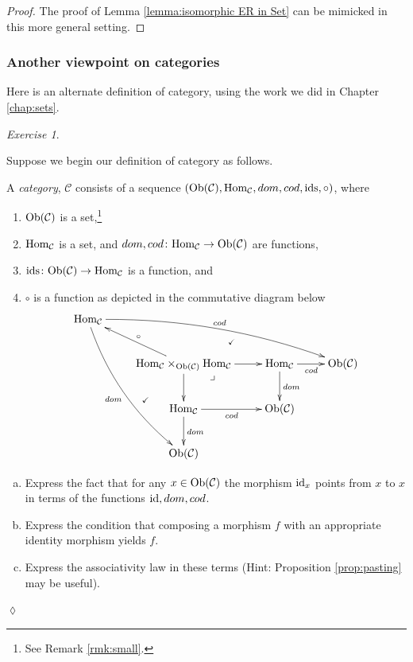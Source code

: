 \documentclass{book}
\makeatletter
\def\tn{\textnormal}
\def\mc{\mathcal}
\def\Hom{\tn{Hom}}
\def\Ob{\tn{Ob}}
\def\to{\rightarrow}
\def\taking{\colon}
\def\ullimit{\ar@{}[rd]|(.3)*+{\lrcorner}}
\def\id{\tn{id}}
\def\ids{\tn{ids}}
\def\mcC{\mc{C}}
\theoremstyle{remark}
\newtheorem{exc}[subsubsection]{Exercise}
\newenvironment{exercise}{\begin{exc}}{\hspace*{\fill}$\lozenge$\end{exc}}
\theoremstyle{definition}
\def\sexc{\begin{enumerate}[a.)]\setlength{\itemsep}{.1cm}\setlength{\parskip}{.1cm}\item}
\def\next{\item}
\def\endsexc{\end{enumerate}}
\makeatother
\begin{document}
\begin{proof}

The proof of Lemma \ref{lemma:isomorphic ER in Set} can be mimicked in this more general setting.

\end{proof}


\subsubsection{Another viewpoint on categories}

Here is an alternate definition of category, using the work we did in Chapter \ref{chap:sets}.

\begin{exercise}\label{exc:cat in set}

Suppose we begin our definition of category as follows. 

A {\em category}, $\mcC$ consists of a sequence $(\Ob(\mcC),\Hom_\mcC,dom,cod,\ids,\circ)$, where 
\begin{enumerate}
\item $\Ob(\mcC)$ is a set,\footnote{See Remark \ref{rmk:small}.}
\item $\Hom_\mcC$ is a set, and $dom,cod\taking\Hom_\mcC\to\Ob(\mcC)$ are functions, 
\item $\ids\taking\Ob(\mcC)\to\Hom_\mcC$ is a function, and 
\item $\circ$ is a function as depicted in the commutative diagram below
\begin{align}\label{dia:pullback version of cat}
\xymatrix{
\Hom_\mcC\ar@/^1pc/[drrr]^{cod}\ar@/_1pc/[dddr]_{dom}&&\\
&\Hom_\mcC\times_{\Ob(\mcC)}\Hom_\mcC\ar@{}[ur]|{\checkmark}\ar@{}[ddl]|(.4){\checkmark}\ar[ul]_\circ\ar[r]\ar[d]\ullimit&\Hom_\mcC\ar[r]_{cod}\ar[d]^{dom}&\Ob(\mcC)\\
&\Hom_\mcC\ar[r]_{cod}\ar[d]^{dom}&\Ob(\mcC)\\
&\Ob(\mcC)
}
\end{align}
\end{enumerate}

\sexc Express the fact that for any $x\in\Ob(\mcC)$ the morphism $\id_x$ points from $x$ to $x$ in terms of the functions $\id,dom,cod$. 
\next Express the condition that composing a morphism $f$ with an appropriate identity morphism yields $f$.
\next Express the associativity law in these terms (Hint: Proposition \ref{prop:pasting} may be useful).
\endsexc
\end{exercise}
\end{document}
